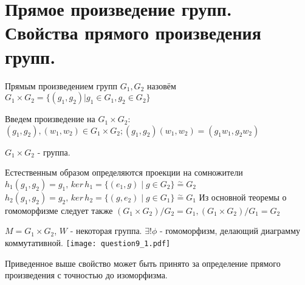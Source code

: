 \section{Прямое произведение групп. Свойства прямого произведения групп.}

\begin{defn}
  Прямым произведением групп $ G_{1}, G_{2} $ назовём \newline
  $ G_{1} \times G_{2} = \{ (g_{1}, g_{2}) | g_{1} \in G_{1}, g_{2} \in G_{2} \} $
\end{defn}

Введем произведение на $ G_{1} \times G_{2} $: \newline 
$ (g_{1}, g_{2}), (w_{1}, w_{2}) \in G_{1} \times G_{2}; (g_{1}, g_{2})(w_{1}, w_{2}) = (g_{1}w_{1}, g_{2}w_{2}) $

\begin{thm}
  $ G_{1} \times G_{2} $ - группа.
\end{thm} 

Естественным образом определяются проекции на сомножители \newline 
$ h_{1}(g_{1},g_{2}) = g_{1}, \, ker \, h_{1} = \{ (e_{1}, g) \; | \; g \in G_{2} \} \overset\sim{=} G_{2} $ \newline
$ h_{2}(g_{1},g_{2}) = g_{2}, \, ker \, h_{2} = \{ (g, e_{2}) \; | \; g \in G_{1} \} \overset\sim{=} G_{1} $ \newline \newline
Из основной теоремы о гомоморфизме следует также \newline
$ (G_{1} \times G_{2})/G_{2} = G_{1}, (G_{1} \times G_{2})/G_{1} = G_{2} $

\begin{thm}
  $ M = G_{1} \times G_{2} $, $ W $ - некоторая группа. \newline
  $  \exists ! \phi $ - гомоморфизм, делающий диаграмму коммутативной. \newline
  \texttt{[image: question9\_1.pdf]}
\end{thm}

\begin{thm}
  Приведенное выше свойство может быть принято за определение прямого произведения с точностью до изоморфизма.
\end{thm}



